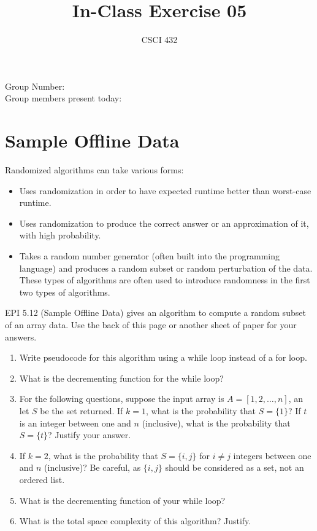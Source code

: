\documentclass{article}
\title{In-Class Exercise 05}
\author{CSCI 432}
\begin{document}
\maketitle

\noindent
Group Number:\\
Group members present today:

\section*{Sample Offline Data}
Randomized algorithms can take various forms:
\begin{itemize}
\item Uses randomization in order to have expected runtime better than
worst-case runtime.
\item Uses randomization to produce the correct answer or an approximation
of it, with high
probability.
\item Takes a random number generator (often built into the programming
language) and produces a random subset or random
perturbation of the data.  These types of algorithms are often used to
introduce randomness in the first two types of algorithms.
\end{itemize}
EPI 5.12 (Sample Offline Data) gives an algorithm to compute a random
subset of an array data.  Use the back of this page or another sheet of paper
for your answers.

\begin{enumerate}
\item Write pseudocode for this algorithm using a while loop instead of a
for loop.
\item What is the decrementing function for the while loop?
\item For the following questions, suppose the input array is
$A=[1,2,\ldots,n]$, an let $S$ be the set
returned. If $k=1$, what is the probability that $S=\{1\}$?  If $t$ is
an integer between one and $n$ (inclusive), what is the
probability that $S=\{t\}$?  Justify your answer.
\item If $k=2$, what is the probability that $S=\{i,j\}$ for $i \neq j$
integers between one and $n$ (inclusive)? Be careful, as
$\{i,j\}$ should be considered as a set, not an ordered list.
\item What is the decrementing function of your while loop?
\item What is the total space complexity of this algorithm? Justify.
\end{enumerate}
\end{document}
